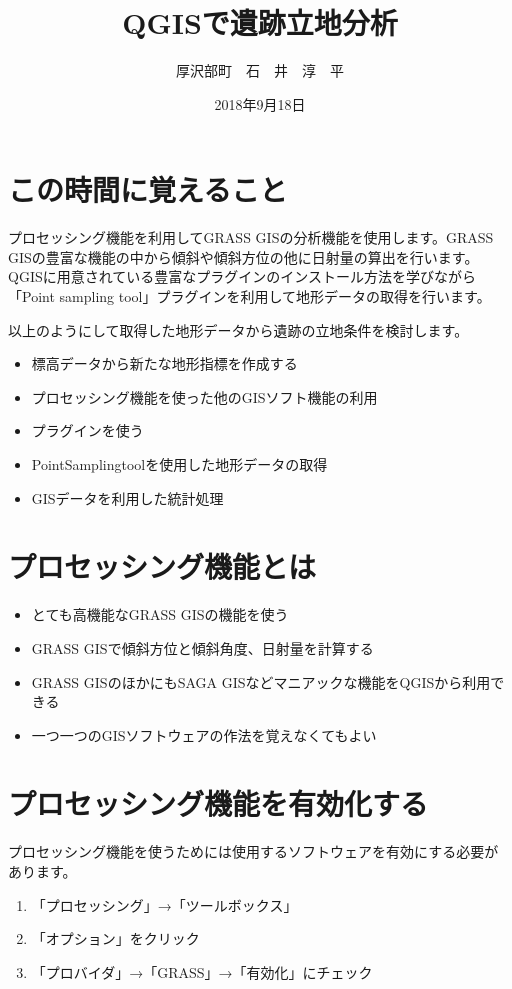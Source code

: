 \documentclass[14Q,twocolumn]{jsarticle}
\title{QGISで遺跡立地分析}%
\date{2018年9月18日}
\author{厚沢部町　石　井　淳　平}              %
\begin{document}
\maketitle
\section{この時間に覚えること}
プロセッシング機能を利用してGRASS GISの分析機能を使用します。GRASS GISの豊富な機能の中から傾斜や傾斜方位の他に日射量の算出を行います。QGISに用意されている豊富なプラグインのインストール方法を学びながら「Point sampling tool」プラグインを利用して地形データの取得を行います。

以上のようにして取得した地形データから遺跡の立地条件を検討します。

\begin{itemize}
\item 標高データから新たな地形指標を作成する
\item プロセッシング機能を使った他のGISソフト機能の利用
\item プラグインを使う
\item PointSamplingtoolを使用した地形データの取得
\item GISデータを利用した統計処理
\end{itemize}


\section{プロセッシング機能とは}

\begin{itemize}
\item とても高機能なGRASS GISの機能を使う
\item GRASS GISで傾斜方位と傾斜角度、日射量を計算する
\item GRASS GISのほかにもSAGA GISなどマニアックな機能をQGISから利用できる
\item 一つ一つのGISソフトウェアの作法を覚えなくてもよい
\end{itemize}


\section{プロセッシング機能を有効化する}
プロセッシング機能を使うためには使用するソフトウェアを有効にする必要があります。

\begin{enumerate}
\item 「プロセッシング」→「ツールボックス」
\item 「オプション」をクリック
\item 「プロバイダ」→「GRASS」→「有効化」にチェック
\end{enumerate}
\end{document}
